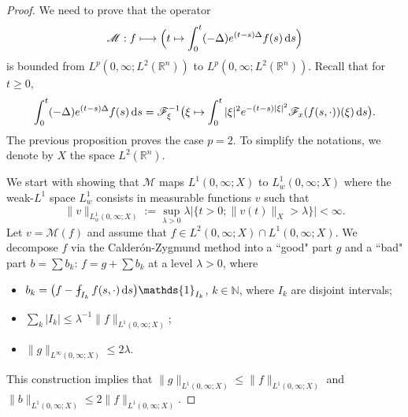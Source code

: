 \documentclass[a4paper, 12pt]{article}
\theoremstyle{plain}
\theoremstyle{definition}
\theoremstyle{remark}
\numberwithin{equation}{section}
\begin{document}
\begin{proof}
We need to prove that the operator
%
\begin{equation}
\label{eq:opMR}
{\mathscr{M}} : 
f \longmapsto \Bigl(t \mapsto \int_0^t (-\Delta)e^{(t-s)\Delta}f(s)\,{\rm d}s\Bigr)
\end{equation}
%
is bounded from $L^p(0,\infty; L^2({\mathds{R}}^n))$ to $L^p(0,\infty; L^2({\mathds{R}}^n))$. 
Recall that for $t\ge 0$,
\[ 
\int_0^t (-\Delta)e^{(t-s)\Delta}f(s)\,{\rm d}s=
{\mathscr{F}}_{\xi}^{-1}\bigl(\xi\mapsto \int_0^t |\xi|^2 e^{-(t-s)|\xi|^2}{\mathscr{F}}_x(f(s,\cdot))(\xi)\,{\rm d}s\bigr).
\]
The previous proposition proves the case $p=2$.
To simplify the notations, we denote by $X$ the space $L^2({\mathds{R}}^n)$.

\noindent
We start with showing that ${\mathscr{M}}$ maps $L^1(0,\infty;X)$ to $L^1_w(0,\infty;X)$ where
the weak-$L^1$ space $L^1_w$ consists in measurable functions $v$ such that 
\[
\|v\|_{L^1_w(0,\infty;X)}:=\sup_{\lambda>0}\lambda \bigl|\{t>0;\|v(t)\|_X>\lambda\}\bigr| <\infty.
\]
Let $v={\mathscr{M}}(f)$ and assume that $f\in L^2(0,\infty;X)\cap L^1(0,\infty;X)$. We decompose $f$ via the Calder\'on-Zygmund
method into a ``good" part $g$ and a ``bad" part $b=\sum b_k$: $f=g+\sum b_k$ at a level $\lambda>0$, where
%
\begin{itemize}
\item
$b_k = \bigl(f-\fint_{I_k}f(s,\cdot)\,{\rm d}s\bigr){\mathds{1}}_{I_k}$, $k\in {\mathds{N}}$, where $I_k$ are disjoint intervals;
\item
$\sum_k |I_k|\le \lambda^{-1}\|f\|_{L^1(0,\infty;X)}$;
\item
$\|g\|_{L^\infty(0,\infty;X)}\le 2\lambda$.
\end{itemize}
%
This construction implies that $\|g\|_{L^1(0,\infty;X)}\le \|f\|_{L^1(0,\infty;X)}$ and $\|b\|_{L^1(0,\infty;X)}\le 2 \|f\|_{L^1(0,\infty;X)}$.


\end{proof}
\end{document}
